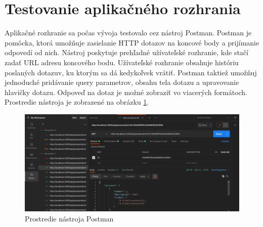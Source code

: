 \section{Testovanie aplikačného rozhrania}
Aplikačné rozhranie sa počas vývoja testovalo cez nástroj Postman. Postman je pomôcka, ktorá umožňuje zasielanie HTTP dotazov na koncové body a prijímanie odpovedí od nich. Nástroj poskytuje prehľadné užívateľské rozhranie, kde stačí zadať URL adresu koncového bodu. Užívateľské rozhranie obsahuje históriu poslaných dotazuv, ku ktorým sa dá kedykoľvek vrátiť. Postman taktiež umožňuj jednoduché pridávanie query parametrov, obsahu tela dotazu a upravovanie hlavičky dotazu. Odpoveď na dotaz je možné zobraziť vo viacerých formátoch. Prostredie nástroja je zobrazené na obrázku \ref{pic:postman}.

    \begin{figure}[!hbt]
        \centering
        \includegraphics[scale=0.3]{obrazky/postman.png}
        \caption{Prostredie nástroja Postman}
        \label{pic:postman}
    \end{figure}